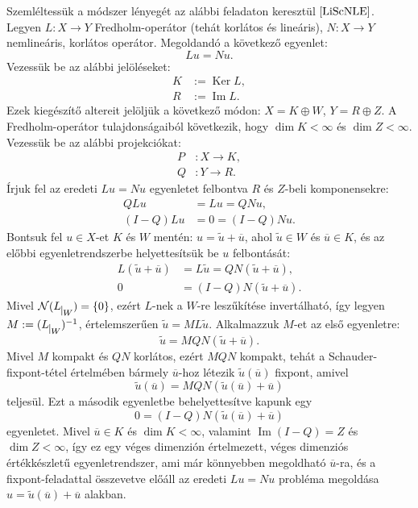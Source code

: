 \documentclass[oneside, titlepage, 12pt, a4paper]{report}
\DeclareMathOperator{\Ima}{Im}	%
\DeclareMathOperator{\Ker}{Ker}	%
\begin{document}
Szemléltessük a módszer lényegét az alábbi feladaton keresztül $\cite{LiScNLE}$. Legyen $L : X \rightarrow Y$ Fredholm-operátor (tehát korlátos és lineáris), $N : X \rightarrow Y$ nemlineáris, korlátos operátor.
Megoldandó a következő egyenlet:
\begin{equation*}
Lu = Nu.
\end{equation*}
Vezessük be az alábbi jelöléseket:
\begin{align*}
K &:= \Ker L, \\
R &:= \Ima L.
\end{align*}
Ezek kiegészítő altereit jelöljük a következő módon: $X = K \oplus W$, $Y = R \oplus Z$. A Fredholm-operátor tulajdonságaiból következik, hogy $\dim K < \infty$ és $\dim Z < \infty$. Vezessük be az alábbi projekciókat:
\begin{align*}
P &: X \rightarrow K, \\
Q &: Y \rightarrow R.
\end{align*}
Írjuk fel az eredeti $Lu = Nu$ egyenletet felbontva $R$ és $Z$-beli komponensekre:
\begin{align*}
Q L u &= L u = Q N u, \\
(I - Q) L u &= 0 = (I - Q) N u.
\end{align*}
Bontsuk fel $u \in X$-et $K$ és $W$ mentén: $u = \widetilde{u} + \overline{u}$, ahol $\widetilde{u} \in W$ és $\overline{u} \in K$, és az előbbi egyenletrendszerbe helyettesítsük be $u$ felbontását:
\begin{align*}
L (\widetilde{u} + \overline{u}) &= L \widetilde{u} = Q N (\widetilde{u} + \overline{u}), \\
0 &= (I - Q) N (\widetilde{u} + \overline{u}).
\end{align*}
Mivel $\mathcal{N}( L_{\mkern 1mu \vrule height 2ex\mkern2mu W}) = \{ 0 \}$, ezért $L$-nek a $W$-re leszűkítése invertálható, így legyen $M := (L_{\mkern 1mu \vrule height 2ex\mkern2mu W})^{-1}$, értelemszerűen $\widetilde{u} = M L \widetilde{u}$. Alkalmazzuk $M$-et az első egyenletre:
\begin{equation*}
\widetilde{u} = M Q N (\widetilde{u} + \overline{u}).
\end{equation*}
Mivel $M$ kompakt és $QN$ korlátos, ezért $MQN$ kompakt, tehát a Schauder-fixpont-tétel értelmében bármely $\overline{u}$-hoz létezik $\widetilde{u}(\overline{u})$ fixpont, amivel
\begin{equation*}
\widetilde{u}(\overline{u}) = M Q N (\widetilde{u}(\overline{u}) + \overline{u})
\end{equation*}
teljesül. Ezt a második egyenletbe behelyettesítve kapunk egy
\begin{equation*}
0 = (I - Q) N (\widetilde{u}(\overline{u}) + \overline{u})
\end{equation*}
egyenletet. Mivel $\overline{u} \in K$ és $\dim K < \infty$, valamint $\Ima (I - Q) = Z$ és $\dim Z < \infty$, így ez egy véges dimenzión értelmezett, véges dimenziós értékkészletű egyenletrendszer, ami már könnyebben megoldható $\overline{u}$-ra, és a fixpont-feladattal összevetve előáll az eredeti $Lu = Nu$ probléma megoldása $u = \widetilde{u}(\overline{u}) + \overline{u}$ alakban.
\end{document}
